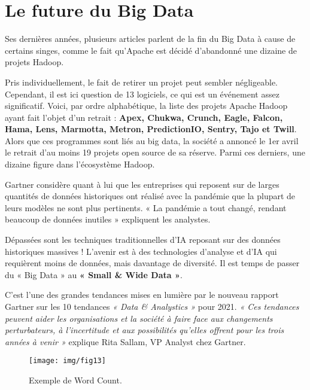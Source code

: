 \section{Le future du Big Data}
Ses dernières années, plusieurs articles parlent de la fin du Big Data à cause de certains singes, comme le fait qu’Apache est décidé d’abandonné une dizaine de projets Hadoop.

Pris individuellement, le fait de retirer un projet peut sembler négligeable. Cependant, il est ici question de 13 logiciels, ce qui est un événement assez significatif. Voici, par ordre alphabétique, la liste des projets Apache Hadoop ayant fait l’objet d’un retrait : \textbf{Apex, Chukwa, Crunch, Eagle, Falcon, Hama, Lens, Marmotta, Metron, PredictionIO, Sentry, Tajo et Twill}. Alors que ces programmes sont liés au big data, la société a annoncé le 1er avril le retrait d’au moins 19 projets open source de sa réserve. Parmi ces derniers, une dizaine figure dans l’écosystème Hadoop.

Gartner considère quant à lui que les entreprises qui reposent sur de larges quantités de données historiques ont réalisé avec la pandémie que la plupart de leurs modèles ne sont plus pertinents. « La pandémie a tout changé, rendant beaucoup de données inutiles » expliquent les analystes.

Dépassées sont les techniques traditionnelles d’IA reposant sur des données historiques massives ! L’avenir est à des technologies d’analyse et d’IA qui requièrent moins de données, mais davantage de diversité. Il est temps de passer du « Big Data » au \textbf{« Small \& Wide Data »}.

C’est l’une des grandes tendances mises en lumière par le nouveau rapport Gartner sur les 10 tendances \textit{ « Data \& Analystics »} pour 2021. \textit{ « Ces tendances peuvent aider les organisations et la société à faire face aux changements perturbateurs, à l’incertitude et aux possibilités qu’elles offrent pour les trois années à venir »} explique Rita Sallam, VP Analyst chez Gartner.

\begin{figure}[h]
	\centering
	\texttt{[image: img/fig13]}
	\caption{Exemple de Word Count.}
\end{figure}